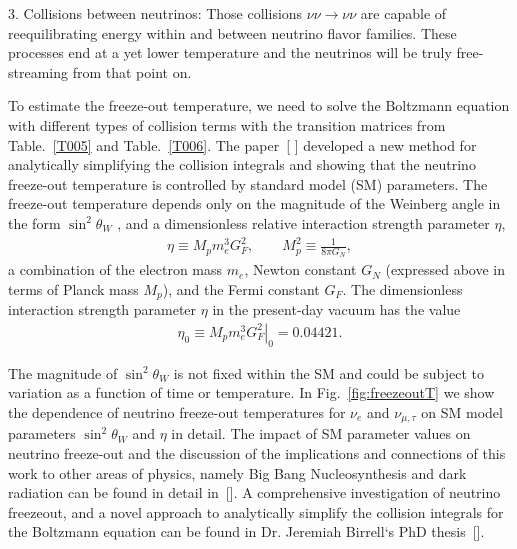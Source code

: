 3. Collisions between neutrinos:
Those collisions $\nu\nu\to\nu\nu$ are capable of reequilibrating energy within and between neutrino flavor families. These processes end at a yet lower temperature and the neutrinos will be truly free-streaming from that point on.
 





To estimate the freeze-out temperature, we need to solve the Boltzmann equation with different types of collision terms with the transition matrices from Table.~\ref{T005} and Table.~\ref{T006}. The paper~[\cite{Birrell:2014uka} ] developed a new method for analytically simplifying the collision integrals and showing that the neutrino freeze-out temperature is controlled by standard model (SM) parameters. The freeze-out temperature depends only on the magnitude of the Weinberg angle in the form $\sin^2\theta_W$ , and a dimensionless relative interaction strength parameter $\eta$,
\begin{align}
\eta\equiv M_p m_e^3 G_F^2, \qquad M_p^2\equiv \frac{1}{8\pi G_N}, \end{align}
a combination of the electron mass $m_e$, Newton constant $G_N$ (expressed above in terms of Planck mass $M_p$), and the Fermi constant $G_F$. The dimensionless interaction strength parameter $\eta$ in the present-day vacuum has the value
\begin{align}
\eta_0\equiv \left.M_p m_e^3 G_F^2\right|_0 = 0.04421 .
\end{align}

The magnitude of $\sin^2\theta_W$ is not fixed within the SM and could be subject to variation as a function of time or temperature. In Fig.~\ref{fig:freezeoutT} we show the dependence of neutrino freeze-out temperatures for $\nu_e$ and $\nu_{\mu,\tau}$ on SM model parameters $\sin^2\theta_W$ and $\eta$ in detail. The impact of SM parameter values on neutrino freeze-out and the discussion of the implications and connections of this work to other areas of physics, namely Big Bang Nucleosynthesis and dark radiation can be found in detail in~[\cite{Dreiner:2011fp,Boehm:2012gr,Blennow:2012de,Birrell:2014uka}]. A comprehensive investigation of neutrino freezeout, and a novel approach to analytically simplify the collision integrals for the Boltzmann equation can be found in Dr. Jeremiah Birrell‘s PhD thesis~[\cite{Birrell:2014ona}].


